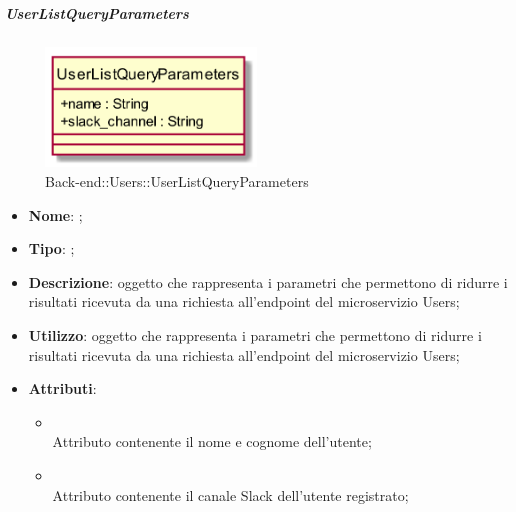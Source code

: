 \hypertarget{UserListQueryParameters_label}{\subparagraph{UserListQueryParameters}}
\begin{figure}[h]
	\centering
	\includegraphics[width=0.50\textwidth,height=\textheight,keepaspectratio]{images/ClassUserListQueryParameters.png}
	\caption{Back-end::Users::UserListQueryParameters}
\end{figure}
\begin{itemize}
	\item \textbf{Nome}: ;
	\item \textbf{Tipo}: ;
	\item \textbf{Descrizione}: oggetto che rappresenta i parametri che permettono di ridurre i risultati ricevuta da una richiesta all'endpoint  del microservizio Users;
	\item \textbf{Utilizzo}: oggetto che rappresenta i parametri che permettono di ridurre i risultati ricevuta da una richiesta all'endpoint  del microservizio Users;
	\item \textbf{Attributi}:
	\begin{itemize}
		\item[]  \\
		Attributo contenente il nome e cognome dell'utente;
		\item[]  \\
		Attributo contenente il canale Slack dell'utente registrato;
	\end{itemize}
\end{itemize}
\FloatBarrier

